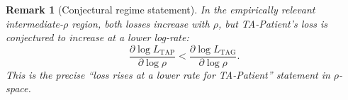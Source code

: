 \documentclass{article}
\newtheorem{remark}{Remark}
\begin{document}
\begin{remark}[Conjectural regime statement]
In the empirically relevant intermediate-\(\rho\) region, both losses increase with \(\rho\), but TA-Patient's loss is conjectured to increase at a lower log-rate:
\[
\frac{\partial \log L_{\mathrm{TAP}}}{\partial \log \rho}
<
\frac{\partial \log L_{\mathrm{TAG}}}{\partial \log \rho}.
\]
This is the precise ``loss rises at a lower rate for TA-Patient'' statement in \(\rho\)-space.
\end{remark}
\end{document}
